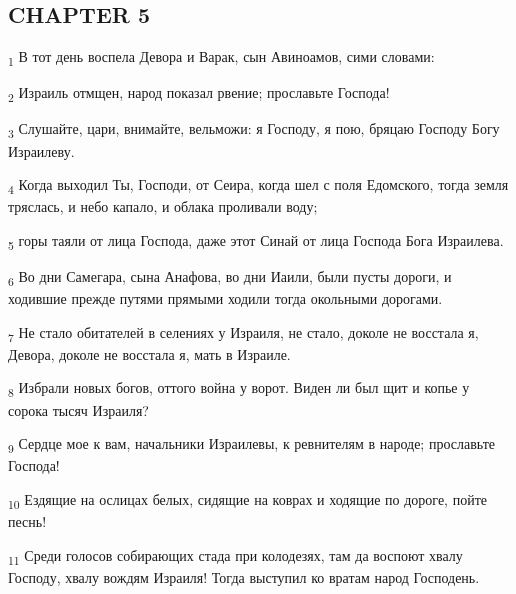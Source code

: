 \subsection{CHAPTER 5}
\begin{tcolorbox}
\textsubscript{1} В тот день воспела Девора и Варак, сын Авиноамов, сими словами:
\end{tcolorbox}
\begin{tcolorbox}
\textsubscript{2} Израиль отмщен, народ показал рвение; прославьте Господа!
\end{tcolorbox}
\begin{tcolorbox}
\textsubscript{3} Слушайте, цари, внимайте, вельможи: я Господу, я пою, бряцаю Господу Богу Израилеву.
\end{tcolorbox}
\begin{tcolorbox}
\textsubscript{4} Когда выходил Ты, Господи, от Сеира, когда шел с поля Едомского, тогда земля тряслась, и небо капало, и облака проливали воду;
\end{tcolorbox}
\begin{tcolorbox}
\textsubscript{5} горы таяли от лица Господа, даже этот Синай от лица Господа Бога Израилева.
\end{tcolorbox}
\begin{tcolorbox}
\textsubscript{6} Во дни Самегара, сына Анафова, во дни Иаили, были пусты дороги, и ходившие прежде путями прямыми ходили тогда окольными дорогами.
\end{tcolorbox}
\begin{tcolorbox}
\textsubscript{7} Не стало обитателей в селениях у Израиля, не стало, доколе не восстала я, Девора, доколе не восстала я, мать в Израиле.
\end{tcolorbox}
\begin{tcolorbox}
\textsubscript{8} Избрали новых богов, оттого война у ворот. Виден ли был щит и копье у сорока тысяч Израиля?
\end{tcolorbox}
\begin{tcolorbox}
\textsubscript{9} Сердце мое к вам, начальники Израилевы, к ревнителям в народе; прославьте Господа!
\end{tcolorbox}
\begin{tcolorbox}
\textsubscript{10} Ездящие на ослицах белых, сидящие на коврах и ходящие по дороге, пойте песнь!
\end{tcolorbox}
\begin{tcolorbox}
\textsubscript{11} Среди голосов собирающих стада при колодезях, там да воспоют хвалу Господу, хвалу вождям Израиля! Тогда выступил ко вратам народ Господень.
\end{tcolorbox}
